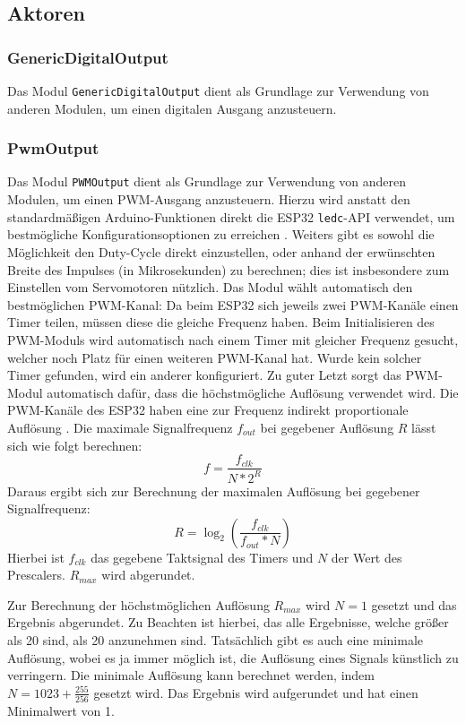 \subsection{Aktoren}
\subsubsection{GenericDigitalOutput}
Das Modul \texttt{GenericDigitalOutput} dient als Grundlage zur Verwendung von anderen Modulen,
um einen digitalen Ausgang anzusteuern.

\subsubsection{PwmOutput}
Das Modul \texttt{PWMOutput} dient als Grundlage zur Verwendung von anderen Modulen,
um einen PWM-Ausgang anzusteuern.
%
Hierzu wird anstatt den standardmäßigen Arduino-Funktionen
direkt die ESP32 \texttt{ledc}-API verwendet,
um bestmögliche Konfigurationsoptionen zu erreichen \cite{esp32-ledc}. %
%
Weiters gibt es sowohl die Möglichkeit den Duty-Cycle direkt einzustellen,
oder anhand der erwünschten Breite des Impulses (in Mikrosekunden) zu berechnen;
dies ist insbesondere zum Einstellen vom Servomotoren nützlich.
%
Das Modul wählt automatisch den bestmöglichen PWM-Kanal:
%
Da beim ESP32 sich jeweils zwei PWM-Kanäle einen Timer teilen,
müssen diese die gleiche Frequenz haben.
%
Beim Initialisieren des PWM-Moduls wird automatisch nach einem Timer mit gleicher Frequenz gesucht,
welcher noch Platz für einen weiteren PWM-Kanal hat.
%
Wurde kein solcher Timer gefunden,
wird ein anderer konfiguriert.
%
Zu guter Letzt sorgt das PWM-Modul automatisch dafür,
dass die höchstmögliche Auflösung verwendet wird.
%
Die PWM-Kanäle des ESP32 haben eine zur Frequenz indirekt proportionale Auflösung \cite{esp32-technical-reference}.
Die maximale Signalfrequenz $f_{out}$ bei gegebener Auflösung $R$ lässt sich wie folgt berechnen:
\begin{equation}
    f = \frac{f_{clk}}{N*2^{R}}
\end{equation}
Daraus ergibt sich zur Berechnung der maximalen Auflösung bei gegebener Signalfrequenz:
\begin{equation}
    R = \log_2\left( \frac{f_{clk}}{f_{out}*N} \right)
\end{equation}
Hierbei ist $f_{clk}$ das gegebene Taktsignal des Timers und $N$ der Wert des Prescalers.
%
$R_{max}$ wird abgerundet.

Zur Berechnung der höchstmöglichen Auflösung $R_{max}$ wird $N=1$ gesetzt und das Ergebnis abgerundet.
%
Zu Beachten ist hierbei, das alle Ergebnisse,
welche größer als 20 sind,
als 20 anzunehmen sind.
%
Tatsächlich gibt es auch eine minimale Auflösung,
wobei es ja immer möglich ist,
die Auflösung eines Signals künstlich zu verringern.
%
Die minimale Auflösung kann berechnet werden, indem $N=1023+\frac{255}{256}$ gesetzt wird.
Das Ergebnis wird aufgerundet und hat einen Minimalwert von 1.

